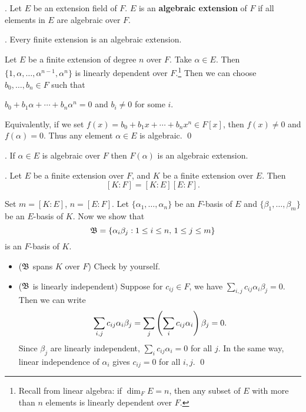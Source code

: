 .  Let \(E\) be an extension field of \(F\). \(E\) is an \textbf{algebraic extension} of \(F\) if all elements in \(E\) are algebraic over \(F\).

\begin{center}
\end{center}

\thm. Every finite extension is an algebraic extension.

\pf Let \(E\) be a finite extension of degree \(n\) over \(F\). Take \(\alpha \in E\). Then \(\{1, \alpha, \dots, \alpha^{n-1}, \alpha^n\}\) is linearly dependent over \(F\).\footnote{Recall from linear algebra: if \(\dim_F E = n\), then any subset of \(E\) with more than \(n\) elements is linearly dependent over \(F\).} Then we can choose \(b_0, \dots, b_n \in F\) such that
\begin{center}
    \(b_0 + b_1 \alpha + \cdots + b_n\alpha^n = 0\) and \(b_i \neq 0\) for some \(i\).
\end{center}
Equivalently, if we set \(f(x) = b_0 + b_1 x + \cdots + b_n x^n \in F[x]\), then \(f(x) \neq 0\) and \(f(\alpha) = 0\). Thus any element \(\alpha \in E\) is algebraic. \qed

\cor. If \(\alpha \in E\) is algebraic over \(F\) then \(F(\alpha)\) is an algebraic extension.

\thm. Let \(E\) be a finite extension over \(F\), and \(K\) be a finite extension over \(E\). Then
\[
    [K: F] = [K : E] [E : F].
\]

\pf Set \(m = [K : E]\), \(n = [E : F]\). Let \(\{\alpha_1, \dots, \alpha_n\}\) be an \(F\)-basis of \(E\) and \(\{\beta_1, \dots, \beta_m\}\) be an \(E\)-basis of \(K\). Now we show that
\[
    \mathfrak{B} = \{\alpha_i \beta_j : 1 \leq i \leq n,\, 1 \leq j \leq m\}
\]
is an \(F\)-basis of \(K\).
\begin{itemize}
    \item (\(\mathfrak{B}\) spans \(K\) over \(F\)) Check by yourself.
    \item (\(\mathfrak{B}\) is linearly independent) Suppose for \(c_{ij} \in F\), we have \(\sum_{i, j} c_{ij}\alpha_i\beta_j = 0\). Then we can write
    \[
        \sum_{i, j} c_{ij}\alpha_i\beta_j = \sum_{j}\left( \sum_{i} c_{ij}\alpha_i \right)\beta_j = 0.
    \]
    Since \(\beta_j\) are linearly independent, \(\sum_i c_{ij} \alpha_i = 0\) for all \(j\). In the same way, linear independence of \(\alpha_i\) gives \(c_{ij} = 0\) for all \(i, j\). \qed
\end{itemize}

